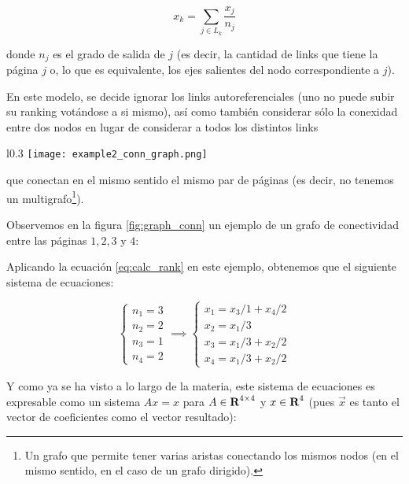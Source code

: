 \begin{equation}\label{eq:calc_rank}
    x_k = \sum_{j\in L_k} \dfrac{x_j}{n_j} 
\end{equation}

donde $n_j$ es el grado de salida de $j$ (es decir, la cantidad de links que
tiene la p\'agina $j$ o, lo que es equivalente, los ejes salientes del nodo
correspondiente a $j$).

\par En este modelo, se decide ignorar los links autoreferenciales (uno no puede
subir su ranking vot\'andose a si mismo), as\'i como tambi\'en considerar s\'olo
la conexidad entre dos nodos en lugar de considerar a todos los distintos links
\begin{wrapfigure}[11]{l}{0.3\textwidth}
    \texttt{[image: example2\_conn\_graph.png]}
    \caption{Grafo de Conectividad~\cite{Bryan2006}}
    \label{fig:graph_conn}
\end{wrapfigure}
\noindent

que conectan en el mismo sentido el mismo par de p\'aginas (es decir, no
tenemos un multigrafo\footnote{Un grafo que permite tener varias aristas
conectando los mismos nodos (en el mismo sentido, en el caso de un grafo
dirigido).}).

\par Observemos en la figura \ref{fig:graph_conn} un ejemplo de un grafo de
conectividad entre las p\'aginas $1, 2, 3$ y $4$:

\par Aplicando la ecuaci\'on \ref{eq:calc_rank} en este ejemplo, obtenemos que
el siguiente sistema de ecuaciones:

\begin{equation}
    \begin{cases}
        n_1 = 3\\
        n_2 = 2\\
        n_3 = 1\\
        n_4 = 2
    \end{cases}
    \implies
    \begin{cases}
        x_1 = x_3/1 + x_4/2\\
        x_2 = x_1/3\\
        x_3 = x_1/3 + x_2/2\\
        x_4 = x_1/3 + x_2/2
    \end{cases}
\end{equation}

\par Y como ya se ha visto a lo largo de la materia, este sistema de ecuaciones
es expresable como un sistema $Ax = x$ para $A\in\hbox{\bf R}^{4\times4}$ y
$x\in\hbox{\bf R}^4 $ (pues $\vec{x}$ es tanto el vector de coeficientes
como el vector resultado):


